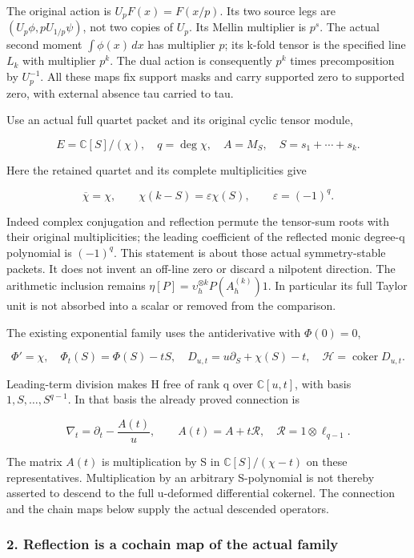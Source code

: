The original action is \(U_p F(x)=F(x/p)\). Its two source legs are \((U_p\phi,pU_{1/p}\psi)\), not two copies of \(U_p\). Its Mellin multiplier is \(p^s\). The actual second moment \(\int\phi(x)\,dx\) has multiplier \(p\); its k-fold tensor is the specified line \(L_k\) with multiplier \(p^k\). The dual action is consequently \(p^k\) times precomposition by \(U_p^{-1}\). All these maps fix support masks and carry supported zero to supported zero, with external absence tau carried to tau.

Use an actual full quartet packet and its original cyclic tensor module,

\[
E=\mathbb C[S]/(\chi),\quad q=\deg\chi,\quad A=M_S,
\quad S=s_1+\cdots+s_k.
\tag{RW2}
\]

Here the retained quartet and its complete multiplicities give

\[
\overline\chi=\chi,\qquad
\chi(k-S)=\varepsilon\chi(S),\qquad\varepsilon=(-1)^q.
\tag{RW3}
\]

Indeed complex conjugation and reflection permute the tensor-sum roots with their original multiplicities; the leading coefficient of the reflected monic degree-q polynomial is \((-1)^q\). This statement is about those actual symmetry-stable packets. It does not invent an off-line zero or discard a nilpotent direction. The arithmetic inclusion remains \(\eta[P]=\upsilon_h^{\otimes k}P(A_h^{(k)})1\). In particular its full Taylor unit is not absorbed into a scalar or removed from the comparison.

The existing exponential family uses the antiderivative with \(\Phi(0)=0\),

\[
\Phi'=\chi,\quad\Phi_t(S)=\Phi(S)-tS,\quad
D_{u,t}=u\partial_S+\chi(S)-t,
\quad\mathcal H=\operatorname{coker}D_{u,t}.
\tag{RW4}
\]

Leading-term division makes H free of rank q over \(\mathbb C[u,t]\), with basis \(1,S,\ldots,S^{q-1}\). In that basis the already proved connection is

\[
\nabla_t=\partial_t-\frac{A(t)}u,\qquad
A(t)=A+t\mathcal R,
\quad\mathcal R=1\otimes\ell_{q-1}.
\tag{RW5}
\]

The matrix \(A(t)\) is multiplication by S in \(\mathbb C[S]/(\chi-t)\) on these representatives. Multiplication by an arbitrary S-polynomial is not thereby asserted to descend to the full u-deformed differential cokernel. The connection and the chain maps below supply the actual descended operators.

\subsubsection{2. Reflection is a cochain map of the actual family}\label{endpoint-f1_reflection--reflection-is-a-cochain-map-of-the-actual-family}

